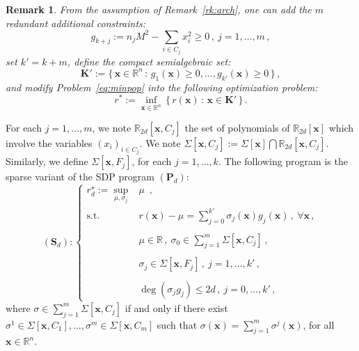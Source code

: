 \documentclass[preprint,fleqn,nocopyrightspace]{sigplanconf}
\newcommand{\mons}[2]{\N_{#1}^{#2}}
\newcommand{\R}{\mathbb{R}}
\newcommand{\N}{\mathbb{N}}
\newcommand{\x}{\mathbf{x}}
\def\P{\mathbf{P}}
\def\S{\mathbf{S}}
\def\K{\mathbf{K}}
\def\S{\mathbf{S}}
\theoremstyle{plain}
\newtheorem{remark}{Remark}
\begin{document}
\begin{remark}
\label{rk:sparsearch}
From the assumption of Remark~\ref{rk:arch}, one can add the $m$ redundant additional constraints:
\begin{equation}
\label{eq:assum_sos_sparse}
g_{k + j} := n_j M^2 - \sum_{i \in C_j} {x_i^2} \geq 0\,, \  j=1 ,\dots, m \,,
\end{equation}
set $k' = k + m$, define the compact semialgebraic set:
\[\K' := \{\, \x \in \R^n \, : \, g_1 (\x) \geq 0, \dots, g_{k'} (\x) \geq 0 \,\} \,,\]
and modify Problem~\eqref{eq:minpop} into the following optimization problem:
\begin{equation}
\label{eq:sparseminpop}
r^*  :=  \inf_{\x \in \R^n} \, \{ \, r (\x) \, : \, \x \in \K' \, \} \,.
\end{equation}
\end{remark}
For each $j=1 ,\dots,m$, we note $\R_{2 d}[\x, C_j]$ the set of polynomials of $\R_{2 d}[\x]$ which involve the variables $(x_i)_{i \in C_j}$. We note $\Sigma [\x, C_j] := \Sigma [\x] \bigcap \R_{2 d}[\x, C_j]$. Similarly, we define $\Sigma [\x, F_j]$, for each $j=1, \dots, k$.
%
The following program is the sparse variant of the SDP program $(\P_d)$:
\[
(\S_d):\left\{			
\begin{array}{rl}
r_d^\star := \sup\limits_{\mu, \sigma_j} & \mu\enspace, \\	 
\text{s.t.} & r (\x) - \mu = \sum_{j = 0}^{k'} \sigma_j(\x) g_j(\x) \,, \ \forall \x \,, \\
\\
& \mu\in \R \,,\  \sigma_0 \in \sum_{j = 1}^m \Sigma [\x, C_j] \,, \\
\\
& \sigma_j \in \Sigma[\x, F_j]  \,,\ j = 1,\dots,k' \,, \\
\\
& \deg (\sigma_j g_j) \leq 2 d  \,,\ j = 0,\dots,k' \,,
\end{array} \right.
\]
%
where $\sigma \in \sum_{j = 1}^m \Sigma [\x, C_j]$ if and only if there exist $\sigma^1 \in \Sigma[\x, C_1], \dots, \sigma^m \in \Sigma[\x,C_m]$ such that $\sigma (\x) = \sum_{j = 1}^m \sigma^j (\x)$, for all $\x \in \R^n$.
%
\end{document}
